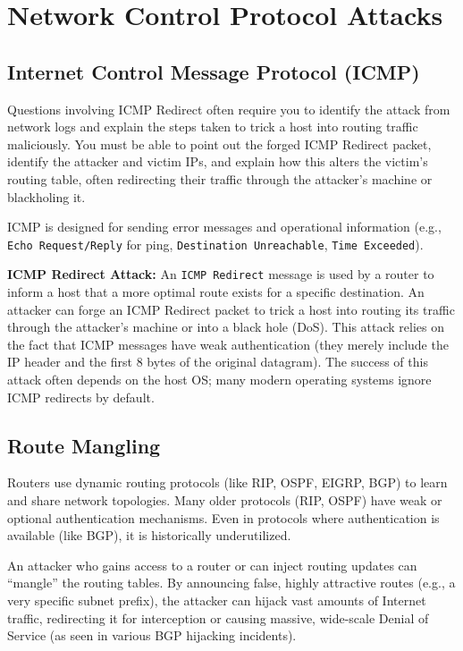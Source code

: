 \section{Network Control Protocol Attacks}

\subsection{Internet Control Message Protocol (ICMP)}

\begin{tcolorbox}[colback=blue!5!white,colframe=blue!75!black,title=Exam Insight]
Questions involving ICMP Redirect often require you to identify the attack from network logs and explain the steps taken to trick a host into routing traffic maliciously. You must be able to point out the forged ICMP Redirect packet, identify the attacker and victim IPs, and explain how this alters the victim's routing table, often redirecting their traffic through the attacker's machine or blackholing it.
\end{tcolorbox}

ICMP is designed for sending error messages and operational information (e.g., \texttt{Echo Request/Reply} for ping, \texttt{Destination Unreachable}, \texttt{Time Exceeded}).

\textbf{ICMP Redirect Attack:}
An \texttt{ICMP Redirect} message is used by a router to inform a host that a more optimal route exists for a specific destination. An attacker can forge an ICMP Redirect packet to trick a host into routing its traffic through the attacker's machine or into a black hole (DoS). This attack relies on the fact that ICMP messages have weak authentication (they merely include the IP header and the first 8 bytes of the original datagram). The success of this attack often depends on the host OS; many modern operating systems ignore ICMP redirects by default.

\subsection{Route Mangling}
Routers use dynamic routing protocols (like RIP, OSPF, EIGRP, BGP) to learn and share network topologies. Many older protocols (RIP, OSPF) have weak or optional authentication mechanisms. Even in protocols where authentication is available (like BGP), it is historically underutilized. 

An attacker who gains access to a router or can inject routing updates can ``mangle'' the routing tables. By announcing false, highly attractive routes (e.g., a very specific subnet prefix), the attacker can hijack vast amounts of Internet traffic, redirecting it for interception or causing massive, wide-scale Denial of Service (as seen in various BGP hijacking incidents).


